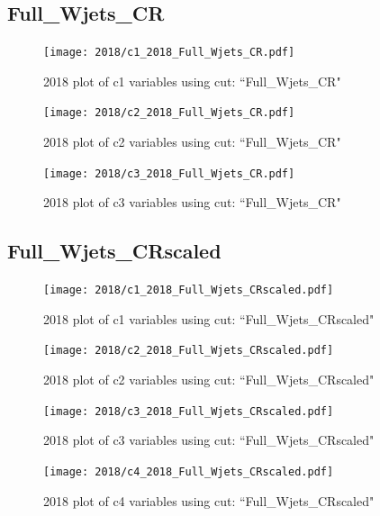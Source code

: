 \documentclass{article}
\begin{document}
      \subsection*{Full\_Wjets\_CR}
                        \begin{figure}[H]
                            \centering
                            \caption{2018 plot of c1 variables using cut: ``Full\_Wjets\_CR"}
                            \texttt{[image: 2018/c1\_2018\_Full\_Wjets\_CR.pdf]}
                        \end{figure}    
                        \begin{figure}[H]
                            \centering
                            \caption{2018 plot of c2 variables using cut: ``Full\_Wjets\_CR"}
                            \texttt{[image: 2018/c2\_2018\_Full\_Wjets\_CR.pdf]}
                        \end{figure}    
                        \begin{figure}[H]
                            \centering
                            \caption{2018 plot of c3 variables using cut: ``Full\_Wjets\_CR"}
                            \texttt{[image: 2018/c3\_2018\_Full\_Wjets\_CR.pdf]}
                        \end{figure}    
      \subsection*{Full\_Wjets\_CRscaled}
                        \begin{figure}[H]
                            \centering
                            \caption{2018 plot of c1 variables using cut: ``Full\_Wjets\_CRscaled"}
                            \texttt{[image: 2018/c1\_2018\_Full\_Wjets\_CRscaled.pdf]}
                        \end{figure}    
                        \begin{figure}[H]
                            \centering
                            \caption{2018 plot of c2 variables using cut: ``Full\_Wjets\_CRscaled"}
                            \texttt{[image: 2018/c2\_2018\_Full\_Wjets\_CRscaled.pdf]}
                        \end{figure}    
                        \begin{figure}[H]
                            \centering
                            \caption{2018 plot of c3 variables using cut: ``Full\_Wjets\_CRscaled"}
                            \texttt{[image: 2018/c3\_2018\_Full\_Wjets\_CRscaled.pdf]}
                        \end{figure}    
                        \begin{figure}[H]
                            \centering
                            \caption{2018 plot of c4 variables using cut: ``Full\_Wjets\_CRscaled"}
                            \texttt{[image: 2018/c4\_2018\_Full\_Wjets\_CRscaled.pdf]}
                        \end{figure}    
\end{document}
